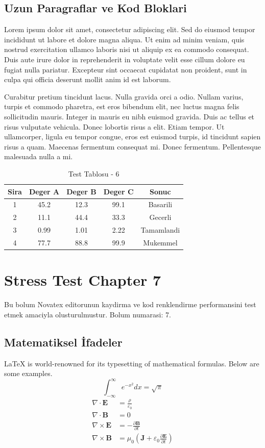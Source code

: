 \documentclass[12pt,a4paper]{article}
\begin{document}
\subsection{Uzun Paragraflar ve Kod Bloklari}
Lorem ipsum dolor sit amet, consectetur adipiscing elit. Sed do eiusmod tempor incididunt ut labore et dolore magna aliqua. Ut enim ad minim veniam, quis nostrud exercitation ullamco laboris nisi ut aliquip ex ea commodo consequat. Duis aute irure dolor in reprehenderit in voluptate velit esse cillum dolore eu fugiat nulla pariatur. Excepteur sint occaecat cupidatat non proident, sunt in culpa qui officia deserunt mollit anim id est laborum.

Curabitur pretium tincidunt lacus. Nulla gravida orci a odio. Nullam varius, turpis et commodo pharetra, est eros bibendum elit, nec luctus magna felis sollicitudin mauris. Integer in mauris eu nibh euismod gravida. Duis ac tellus et risus vulputate vehicula. Donec lobortis risus a elit. Etiam tempor. Ut ullamcorper, ligula eu tempor congue, eros est euismod turpis, id tincidunt sapien risus a quam. Maecenas fermentum consequat mi. Donec fermentum. Pellentesque malesuada nulla a mi.

\begin{table}[h!]
\centering
\begin{tabular}{|c|c|c|c|c|}
\hline
\textbf{Sira} & \textbf{Deger A} & \textbf{Deger B} & \textbf{Deger C} & \textbf{Sonuc} \\
\hline
1 & 45.2 & 12.3 & 99.1 & Basarili \\
2 & 11.1 & 44.4 & 33.3 & Gecerli \\
3 & 0.99 & 1.01 & 2.22 & Tamamlandi \\
4 & 77.7 & 88.8 & 99.9 & Mukemmel \\
\hline
\end{tabular}
\caption{Test Tablosu - 6}
\end{table}

\newpage
\section{Stress Test Chapter 7}
Bu bolum Novatex editorunun kaydirma ve kod renklendirme performansini test etmek amaciyla olusturulmustur. Bolum numarasi: 7.

\subsection{Matematiksel İfadeler}
\LaTeX{} is world-renowned for its typesetting of mathematical formulas. Below are some examples.
\begin{equation}
\int_{-\infty}^{\infty} e^{-x^2} dx = \sqrt{\pi}
\end{equation}
\begin{align}
\nabla \cdot \mathbf{E} &= \frac{\rho}{\varepsilon_0} \\
\nabla \cdot \mathbf{B} &= 0 \\
\nabla \times \mathbf{E} &= -\frac{\partial \mathbf{B}}{\partial t} \\
\nabla \times \mathbf{B} &= \mu_0\left(\mathbf{J} + \varepsilon_0 \frac{\partial \mathbf{E}}{\partial t}\right)
\end{align}
\end{document}

